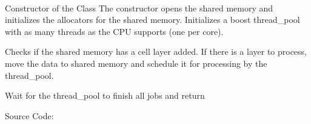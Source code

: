 \documentclass[a4paper,10pt,english]{sphinxmanual}
\begin{document}
\begin{fulllineitems}
\label{\detokenize{drc/drc:_CPPv412CleanerSlave}}%
\pysigstartmultiline
{}%
\pysigstopmultiline~

\begin{fulllineitems}
\label{\detokenize{drc/drc:_CPPv4N12CleanerSlave12CleanerSlaveE}}%
\pysigstartmultiline
{}%
\pysigstopmultiline
Constructor of the Class
The constructor opens the shared memory and initializes the allocators for the shared memory. Initializes a boost thread\_pool with as many threads as the CPU supports (one per core).

\end{fulllineitems}


\begin{fulllineitems}
\label{\detokenize{drc/drc:_CPPv4N12CleanerSlave5cleanE}}%
\pysigstartmultiline
{}%
\pysigstopmultiline
Checks if the shared memory has a cell layer added. If there is a layer to process, move the data to shared memory and schedule it for processing by the thread\_pool.

\end{fulllineitems}


\begin{fulllineitems}
\label{\detokenize{drc/drc:_CPPv4N12CleanerSlave12join_threadsE}}%
\pysigstartmultiline
{}%
\pysigstopmultiline
Wait for the thread\_pool to finish all jobs and return

\end{fulllineitems}


\end{fulllineitems}


Source Code: {\hyperref[\detokenize{source_code/cleanerslave_source:cssource}]{}}
\end{document}
